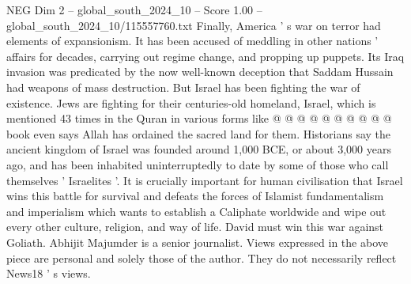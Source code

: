 \begin{textsample}{NEG Dim 2 – global\_south\_2024\_10 – Score 1.00 – global\_south\_2024\_10/115557760.txt}
Finally, America ' s war on terror had elements of expansionism.
It has been accused of meddling in other nations ' affairs for decades, carrying out regime change, and propping up puppets.
Its Iraq invasion was predicated by the now well-known deception that Saddam Hussain had weapons of mass destruction.
But Israel has been fighting the war of existence.
Jews are fighting for their centuries-old homeland, Israel, which is mentioned 43 times in the Quran in various forms like @ @ @ @ @ @ @ @ @ @ book even says Allah has ordained the sacred land for them.
Historians say the ancient kingdom of Israel was founded around 1,000 BCE, or about 3,000 years ago, and has been inhabited uninterruptedly to date by some of those who call themselves ' Israelites '.
It is crucially important for human civilisation that Israel wins this battle for survival and defeats the forces of Islamist fundamentalism and imperialism which wants to establish a Caliphate worldwide and wipe out every other culture, religion, and way of life.
David must win this war against Goliath.
Abhijit Majumder is a senior journalist.
Views expressed in the above piece are personal and solely those of the author.
They do not necessarily reflect News18 ' s views.

\end{textsample}
